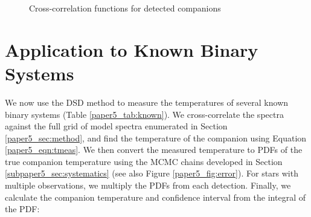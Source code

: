 \begin{figure}
  
  \caption{Cross-correlation functions for detected companions}
  \label{paper5_fig:detections2}
\end{figure}

\section{Application to Known Binary Systems}
\label{paper5_sec:results}

We now use the DSD method to measure the temperatures of several known binary systems (Table \ref{paper5_tab:known}). We cross-correlate the spectra against the full grid of model spectra enumerated in Section \ref{paper5_sec:method}, and find the temperature of the companion using Equation \ref{paper5_eqn:tmeas}. We then convert the measured temperature to PDFs of the true companion temperature using the MCMC chains developed in Section \ref{subpaper5_sec:systematics} (see also Figure \ref{paper5_fig:error}). For stars with multiple observations, we multiply the PDFs from each detection. Finally, we calculate the companion temperature and confidence interval from the integral of the PDF:

